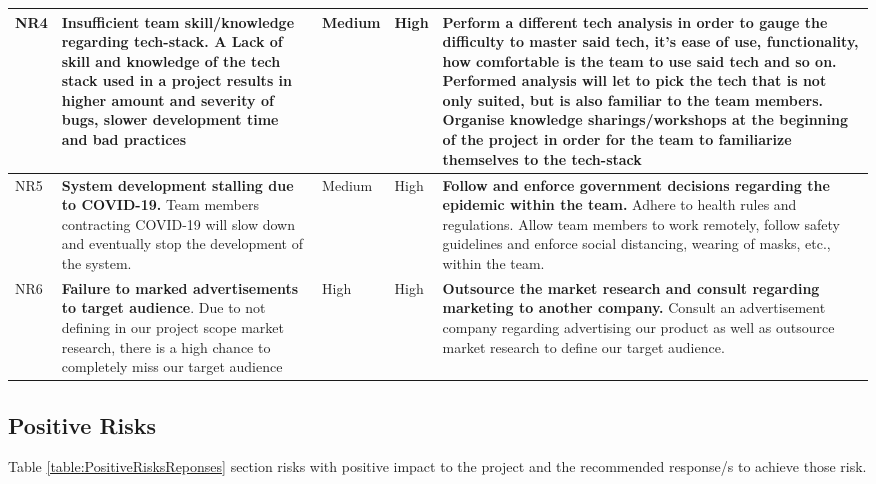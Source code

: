 \documentclass{VUMIFPSkursinis}
\begin{document}
\begin{center}
\begin{longtable}{|C{1cm}|L{4.55cm}|C{2cm}|C{2cm}|L{4.55cm}|}
		NR4 &
		\textbf{Insufficient team skill/knowledge regarding tech-stack}. A Lack of skill and knowledge of the tech stack used in a project results in higher amount and severity of bugs, slower development time and bad practices&
		Medium&
		High&
		Perform a different tech analysis in order to gauge the difficulty to master said tech, it's ease of use, functionality, how comfortable is the team to use said tech and so on. Performed analysis will let to pick the tech that is not only suited, but is also familiar to the team members.
		Organise knowledge sharings/workshops at the beginning of the project in order for the team to familiarize themselves to the tech-stack\\ \hline	
		NR5 &
		\textbf{System development stalling due to COVID-19.} Team members contracting COVID-19 will slow down and eventually stop the development of the system.&
		Medium&
		High&
		\textbf{Follow and enforce government decisions regarding the epidemic within the team.} Adhere to health rules and regulations. Allow team members to work remotely, follow safety guidelines and enforce social distancing, wearing of masks, etc., within the team.\\ \hline 
		NR6 &
		\textbf{Failure to marked advertisements to target audience}. Due to not defining in our project scope market research, there is a high chance to completely miss our target audience	 &
		High &
		High &
		\textbf{Outsource the market research and consult regarding marketing to another company.} Consult an advertisement company regarding advertising our product as well as outsource market research to define our target audience.  \\ \hline
	\end{longtable}
\end{center}


\subsection{Positive Risks}
Table \ref{table:PositiveRisksReponses} section risks with positive impact to the project and the recommended response/s to achieve those risk.
\end{document}
